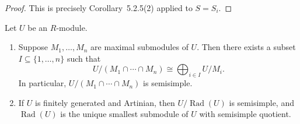 \begin{proof}
    This is precisely Corollary~5.2.5(2) applied to \(S=S_i\).
\end{proof}

\begin{lemma}
    Let $U$ be an $R$-module.
    \begin{enumerate}
        \item Suppose $M_1,\dots,M_n$ are maximal submodules of $U$. Then there exists a
              subset $I\subseteq \{1,\dots,n\}$ such that
              \[
                  U/(M_1\cap \cdots \cap M_n)\cong \bigoplus_{i\in I} U/M_i.
              \]
              In particular, $U/(M_1\cap \cdots \cap M_n)$ is semisimple.
        \item If $U$ is finitely generated and Artinian, then $U/\operatorname{Rad}(U)$ is
              semisimple, and $\operatorname{Rad}(U)$ is the unique smallest submodule
              of $U$ with semisimple quotient.
    \end{enumerate}
\end{lemma}

